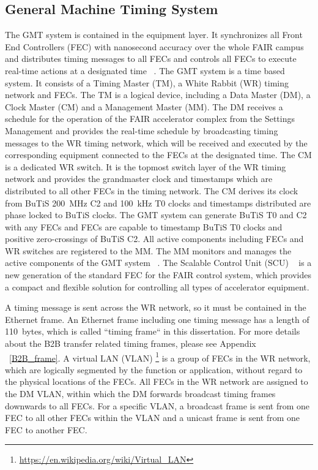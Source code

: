 \subsection{General Machine Timing System}
The GMT system is contained in the equipment layer. It synchronizes all Front End Controllers (\gls{FEC}) with nanosecond accuracy over the whole FAIR campus and distributes timing messages to all FECs and controls all FECs to execute real-time actions at a designated time ~\cite{beck_new_2012}. The GMT system is a time based system. It consists of a Timing Master (\gls{TM}), a White Rabbit (WR) timing network and FECs. The TM is a logical device, including a Data Master (\gls{DM}), a Clock Master (\gls{CM}) and a Management Master (\gls{MM}). The DM receives a schedule for the operation of the FAIR accelerator complex from the Settings Management and provides the real-time schedule by broadcasting timing messages to the WR timing network, which will be received and executed by the corresponding equipment connected to the FECs at the designated time. The CM is a dedicated WR switch. It is the topmost switch layer of the WR timing network and provides the grandmaster clock and timestamps which are distributed to all other FECs in the timing network. The CM derives its clock from BuTiS \SI{200}{MHz} C2 and \SI{100}{kHz} T0 clocks and timestamps distributed are phase locked to BuTiS clocks. The GMT system can generate BuTiS T0 and C2 with any FECs and FECs are capable to timestamp BuTiS T0 clocks and positive zero-crossings of BuTiS C2. All active components including FECs and WR switches are registered to the MM. The MM monitors and manages the active components of the GMT system ~\cite{beck_general_2013, beck_timing_2015}. The Scalable Control Unit (\gls{SCU}) ~\cite{kaiser_f-tn-c-008e_2014} is a new generation of the standard FEC for the FAIR control system, which provides a compact and flexible solution for controlling all types of accelerator equipment.

A timing message is sent across the WR network, so it must be contained in the Ethernet frame. An Ethernet frame including one timing message has a length of \SI{110}{bytes}, which is called ``timing frame`` in this dissertation. For more details about the B2B transfer related timing frames, please see Appendix ~\ref{B2B_frame}. A virtual LAN (VLAN) \footnote{\url{https://en.wikipedia.org/wiki/Virtual_LAN}} is a group of FECs in the WR network, which are logically segmented by the function or application, without regard to the physical locations of the FECs. All FECs in the WR network are assigned to the DM VLAN, within which the DM forwards broadcast timing frames downwards to all FECs. For a specific VLAN, a broadcast frame is sent from one FEC to all other FECs within the VLAN and a unicast frame is sent from one FEC to another FEC.


